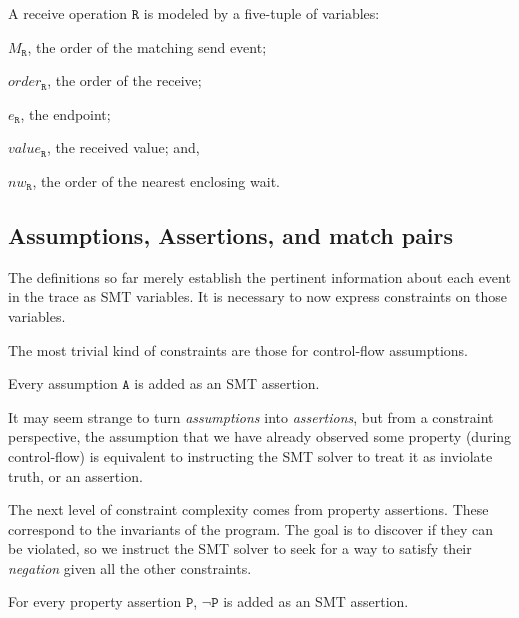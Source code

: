 \begin{definition}[Receive] \label{def:rcv}
A receive operation $\mathtt{R}$ is modeled by a five-tuple of variables:
\begin{compactenum}
\item $M_\mathtt{R}$, the order of the matching send event;

\item $\mathit{order}_\mathtt{R}$, the order of the receive;

\item $e_\mathtt{R}$, the endpoint;

\item $\mathit{value}_\mathtt{R}$, the received value; and,

\item $\mathit{nw}_\mathtt{R}$, the order of the nearest enclosing wait.
\end{compactenum}
\end{definition}

\subsection{Assumptions, Assertions, and match pairs}

The definitions so far merely establish the pertinent information
about each event in the trace as SMT variables. It is necessary to now express
constraints on those variables.

The most trivial kind of constraints are those for control-flow
assumptions.

\begin{definition}[Assumption] \label{def:assm}
Every assumption $\mathtt{A}$ is added as an SMT assertion.
\end{definition}

It may seem strange to turn \emph{assumptions} into
\emph{assertions}, but from a constraint perspective, the assumption
that we have already observed some property (during control-flow) is
equivalent to instructing the SMT solver to treat it as inviolate
truth, or an assertion.

The next level of constraint complexity comes from property
assertions. These correspond to the invariants of the program. The
goal is to discover if they can be violated, so we instruct the SMT
solver to seek for a way to satisfy their \emph{negation} given all
the other constraints.

\begin{definition} \label{def:assert}
For every property assertion $\mathtt{P}$, $\neg \mathtt{P}$ is added as
an SMT assertion.
\end{definition}

